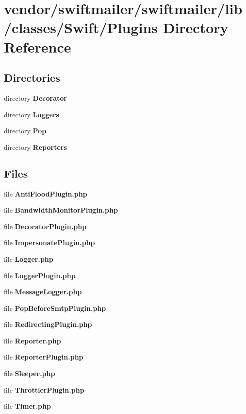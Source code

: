 \section{vendor/swiftmailer/swiftmailer/lib/classes/\+Swift/\+Plugins Directory Reference}
\label{dir_5e8aa42cdbdc2aa5844004b83b5028bf}
\subsection*{Directories}
\begin{DoxyCompactItemize}
\item 
directory {\bf Decorator}
\item 
directory {\bf Loggers}
\item 
directory {\bf Pop}
\item 
directory {\bf Reporters}
\end{DoxyCompactItemize}
\subsection*{Files}
\begin{DoxyCompactItemize}
\item 
file {\bf Anti\+Flood\+Plugin.\+php}
\item 
file {\bf Bandwidth\+Monitor\+Plugin.\+php}
\item 
file {\bf Decorator\+Plugin.\+php}
\item 
file {\bf Impersonate\+Plugin.\+php}
\item 
file {\bf Logger.\+php}
\item 
file {\bf Logger\+Plugin.\+php}
\item 
file {\bf Message\+Logger.\+php}
\item 
file {\bf Pop\+Before\+Smtp\+Plugin.\+php}
\item 
file {\bf Redirecting\+Plugin.\+php}
\item 
file {\bf Reporter.\+php}
\item 
file {\bf Reporter\+Plugin.\+php}
\item 
file {\bf Sleeper.\+php}
\item 
file {\bf Throttler\+Plugin.\+php}
\item 
file {\bf Timer.\+php}
\end{DoxyCompactItemize}
